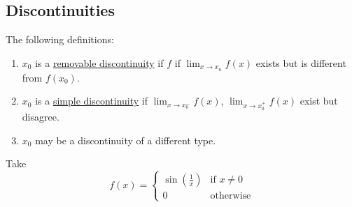 \subsection{Discontinuities}
\begin{definition}[Discontinuities]
    The following definitions:
    \begin{enumerate}[(1)]
        \item $x_0$ is a \ul{removable discontinuity} if $f$ if $\lim_{x\to x_n}f(x)$ exists but is different from $f(x_0)$.
        \item $x_0$ is a \ul{simple discontinuity} if $\lim_{x\to x_0^{-}}f(x)$, $\lim_{x\to x_0^+}f(x)$ exist but disagree.
        \item $x_0$ may be a discontinuity of a different type.
    \end{enumerate}
\end{definition}

\begin{example}
    Take
    \[f(x) = \begin{cases}
            \sin\left( \frac{1}{x} \right) & \text{if }x\neq 0 \\
            0                              & \text{otherwise}
        \end{cases}\]
\end{example}